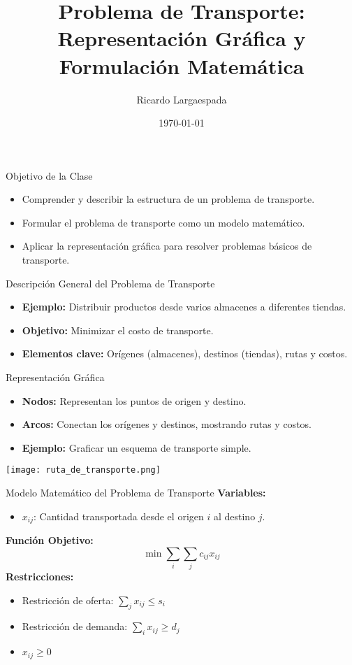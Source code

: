 \documentclass{beamer}
\title{Problema de Transporte: Representación Gráfica y Formulación Matemática}
\author{Ricardo Largaespada}
\date{\today}
\begin{document}
\frame{\titlepage}

\begin{frame}{Objetivo de la Clase}
    \begin{itemize}
        \item Comprender y describir la estructura de un problema de transporte.
        \item Formular el problema de transporte como un modelo matemático.
        \item Aplicar la representación gráfica para resolver problemas básicos de transporte.
    \end{itemize}
\end{frame}

\begin{frame}{Descripción General del Problema de Transporte}
    \begin{itemize}
        \item \textbf{Ejemplo:} Distribuir productos desde varios almacenes a diferentes tiendas.
        \item \textbf{Objetivo:} Minimizar el costo de transporte.
        \item \textbf{Elementos clave:} Orígenes (almacenes), destinos (tiendas), rutas y costos.
    \end{itemize}
\end{frame}

\begin{frame}{Representación Gráfica}
    \begin{itemize}
        \item \textbf{Nodos:} Representan los puntos de origen y destino.
        \item \textbf{Arcos:} Conectan los orígenes y destinos, mostrando rutas y costos.
        \item \textbf{Ejemplo:} Graficar un esquema de transporte simple.
    \end{itemize}
    \begin{center}
        \texttt{[image: ruta\_de\_transporte.png]} %
    \end{center}
\end{frame}

\begin{frame}{Modelo Matemático del Problema de Transporte}
    \textbf{Variables:}
    \begin{itemize}
        \item $x_{ij}$: Cantidad transportada desde el origen $i$ al destino $j$.
    \end{itemize}
    \textbf{Función Objetivo:}
    \begin{equation*}
        \min \sum_{i} \sum_{j} c_{ij} x_{ij}
    \end{equation*}
    \textbf{Restricciones:}
    \begin{itemize}
        \item Restricción de oferta: $\sum_{j} x_{ij} \leq s_i$
        \item Restricción de demanda: $\sum_{i} x_{ij} \geq d_j$
        \item $x_{ij} \geq 0$
    \end{itemize}
\end{frame}
\end{document}
